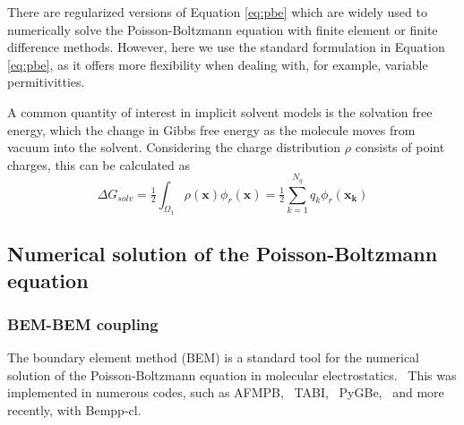 There are regularized versions of Equation \eqref{eq:pbe} \cite{LuZhouHolstMcCammon2008,LeeGengZhao2021} which are widely used to numerically solve the Poisson-Boltzmann equation with finite element or finite difference methods.
However, here we use the standard formulation in Equation \eqref{eq:pbe}, as it offers more flexibility when dealing with, for example, variable permitivitties.

A common quantity of interest in implicit solvent models is the solvation free energy, which the change in Gibbs free energy as the molecule moves from vacuum into the solvent. Considering the charge distribution $\rho$ consists of point charges, this can be calculated as
%
\begin{equation}\label{eq:dG} 
\Delta G_{solv} = \tfrac{1}{2}\int_{\Omega_1} \rho(\mathbf{x})\phi_{r}(\mathbf{x}) = \tfrac{1}{2}\sum_{k=1}^{N_q} q_k\phi_r(\mathbf{x_k})
\end{equation}

\subsection*{\sffamily \large Numerical solution of the Poisson-Boltzmann equation}

\subsubsection*{\sffamily \normalsize BEM-BEM coupling}

The boundary element method (BEM) is a standard tool for the numerical solution of the Poisson-Boltzmann equation in molecular electrostatics.~\cite{ZauharMorgan1985, Shaw1985} This was implemented in numerous codes, such as AFMPB,~\cite{LuETal2006} TABI,~\cite{GengKrasny2013} PyGBe,~\cite{CooperBardhanBarba2014,cooper2016pygbe} and more recently, with Bempp-cl.~\cite{search2022towards} 

